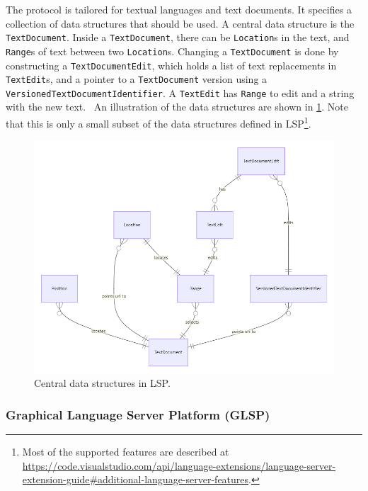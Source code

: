 The protocol is tailored for textual languages and text documents.
It specifies a collection of data structures that should be used.
A central data structure is the \texttt{TextDocument}.
Inside a \texttt{TextDocument}, there can be \texttt{Location}s in the text, and \texttt{Range}s of text between two \texttt{Location}s.
Changing a \texttt{TextDocument} is done by constructing a \texttt{TextDocumentEdit}, which holds a list of text replacements in \texttt{TextEdit}s, and a pointer to a \texttt{TextDocument} version using a \texttt{VersionedTextDocumentIdentifier}.
A \texttt{TextEdit} has \texttt{Range} to edit and a string with the new text.~\cite{microsoftLanguageServerProtocol2020}
An illustration of the data structures are shown in \cref{fig:lsp-data-structures}.
Note that this is only a small subset of the data structures defined in \gls{LSP}\footnote{Most of the supported features are described at \href{https://code.visualstudio.com/api/language-extensions/language-server-extension-guide\#additional-language-server-features}{https://code.visualstudio.com/api/language-extensions/language-server-extension-guide\#additional-language-server-features}.}.

\begin{figure}[htbp]
  \centering
  \includegraphics[width=\textwidth]{figures/lsp-textdocument-data}
  \caption[LSP Central Data Structures]{Central data structures in \gls{LSP}.}\label{fig:lsp-data-structures}
\end{figure}


\subsubsection{Graphical Language Server Platform (GLSP)}\label{sec:glsp}

